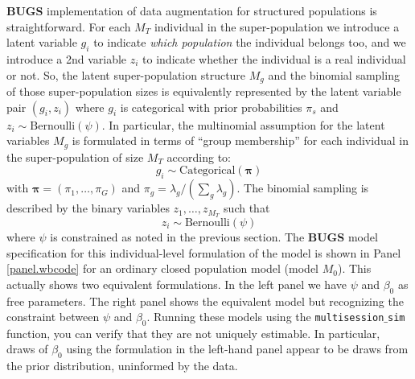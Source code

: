 {\bf BUGS} implementation of data augmentation for structured
populations is straightforward. 
For each $M_{T}$ individual in the
super-population we introduce a latent variable $g_{i}$ to indicate
{\it which population} the individual belongs too, and we introduce a 2nd
variable $z_{i}$ to indicate whether the individual is a real
individual or not.  So, the latent super-population structure $M_{g}$
and the binomial sampling of those super-population sizes is
equivalently represented by the latent variable pair $(g_{i},z_{i})$
where $g_{i}$ is categorical with prior probabilities $\pi_{s}$ and
$z_{i} \sim \mbox{Bernoulli}(\psi)$.  In particular, the multinomial assumption
for the latent variables $M_{g}$ is formulated in terms of ``group
membership'' for each individual in the super-population of size $M_{T}$
according to:
\[
 g_{i} \sim \mbox{Categorical}\left( {\bm \pi} \right)
\]
with ${\bm \pi} = (\pi_{1}, \ldots, \pi_{G})$ and $\pi_{g} =
\lambda_{g}/(\sum_{g} \lambda_{g})$.  The binomial sampling is
described by the binary variables $z_{1},\ldots,z_{M_{T}}$ such that
\[
 z_{i} \sim \mbox{Bernoulli}(\psi)
\]
where $\psi$ is constrained as noted in the previous section.  The
{\bf BUGS} model specification for this individual-level formulation
of the model is shown in Panel \ref{panel.wbcode} for an ordinary
closed population model (model $M_{0}$).  This actually shows two
equivalent formulations. In the left panel we have $\psi$ and
$\beta_{0}$ as free parameters.  The right panel shows the equivalent
model but recognizing the constraint between $\psi$ and $\beta_{0}$.
Running these models using the \mbox{\tt multisession$\_$sim}
function, you can verify that they are not uniquely estimable. In
particular, draws of $\beta_{0}$ using the formulation in the
left-hand panel appear to be draws from the prior distribution,
uninformed by the data.

